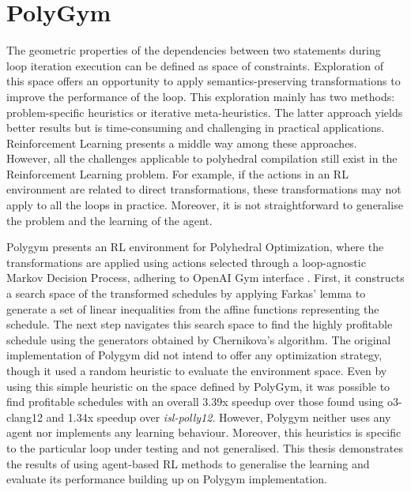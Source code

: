\documentclass[logo,msc]{infthesis}           %
\begin{document}
\section{PolyGym}

The geometric properties of the dependencies between two statements during loop iteration execution can be defined as space of constraints. Exploration of this space offers an opportunity to apply semantics-preserving transformations to improve the performance of the loop. This exploration mainly has two methods: problem-specific heuristics \cite{isl} \cite{Bondhugula07pluto:a} or iterative meta-heuristics\cite{it_Single}\cite{it_multi}. The latter approach yields better results but is time-consuming and challenging in practical applications. Reinforcement Learning presents a middle way among these approaches. However, all the challenges applicable to polyhedral compilation still exist in the Reinforcement Learning problem. For example, if the actions in an RL environment are related to direct transformations, these transformations may not apply to all the loops in practice. Moreover, it is not straightforward to generalise the problem and the learning of the agent.

Polygym presents an RL environment for Polyhedral Optimization\cite{PolyOpt}, where the transformations are applied using actions selected through a loop-agnostic Markov Decision Process, adhering to OpenAI Gym interface \cite{Gym}. First, it constructs a search space of the transformed schedules by applying Farkas' lemma \cite{schrijver1998theory} to generate a set of linear inequalities from the affine functions representing the schedule. The next step navigates this search space to find the highly profitable schedule using the generators obtained by Chernikova's algorithm. The original implementation of Polygym did not intend to offer any optimization strategy, though it used a random heuristic to evaluate the environment space. Even by using this simple heuristic on the space defined by PolyGym, it was possible to find profitable schedules with an overall 3.39x speedup over those found using o3-clang12 and 1.34x speedup over \textit{isl-polly12}. However, Polygym neither uses any agent nor implements any learning behaviour. Moreover, this heuristics is specific to the particular loop under testing and not generalised. This thesis demonstrates the results of using agent-based RL methods to generalise the learning and evaluate its performance building up on Polygym implementation.
\end{document}
